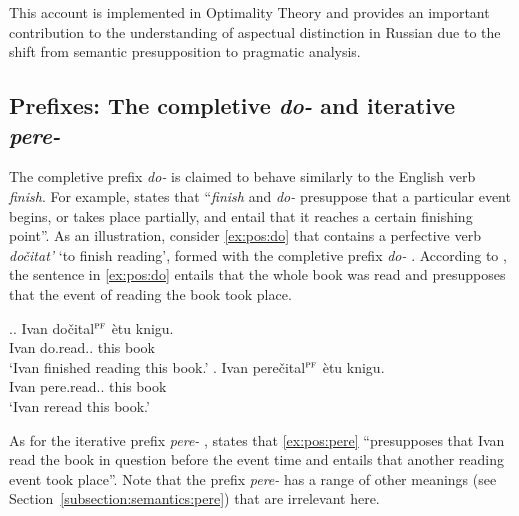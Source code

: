 This account is implemented in Optimality Theory \citep{Blutner:00} and provides an important contribution to the understanding of aspectual distinction in Russian due to the shift from semantic presupposition to pragmatic analysis.

\subsection{Prefixes: The completive  \textit{do-}   and iterative \textit{pere-}  }\label{sec:pragm:old:pref}
The completive  prefix \textit{do-}   is claimed to behave similarly to the English verb \textit{finish}. For example, \citet[75]{Kagan:book} states that ``\textit{finish} and \textit{do-}   presuppose that a particular event begins, or takes place partially, and entail that it reaches a certain finishing point''. As an illustration, consider \ref{ex:pos:do} that contains a perfective verb  \textit{do\v{c}itat'} `to finish reading', formed with the completive  prefix \textit{do-}  . According to \citet{Kagan:book}, the sentence in \ref{ex:pos:do} entails that the whole book was read and presupposes that the event of reading the book took place.

\ex.\ag. \label{ex:pos:do}Ivan do\v{c}ital$^{\textsc{pf}}$ \`{e}tu knigu.\\
Ivan do.read.. this book\\
\trans `Ivan finished reading this book.'
\bg. \label{ex:pos:pere}Ivan pere\v{c}ital$^{\textsc{pf}}$ \`{e}tu knigu.\\
Ivan pere.read.. this book\\
\trans `Ivan reread this book.'

As for the iterative prefix \textit{pere-}  , \citet[145]{Kagan:book} states that \ref{ex:pos:pere} ``presupposes that Ivan read the book in question before the event time and entails that another reading event took place''. Note that the prefix \textit{pere-}   has a range of other meanings (see Section~\ref{subsection:semantics:pere}) that are irrelevant here.

